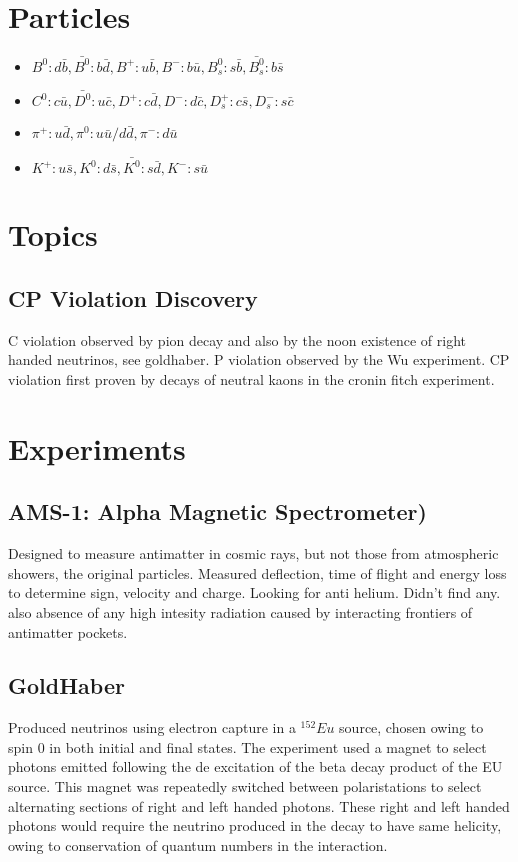 \documentclass[]{article}
\begin{document}
\large

\section*{Particles}

\begin{itemize}
	\item $B^0: d\bar{b}, \bar{B^0}: b\bar{d}, B^+: u\bar{b}, B^-: b\bar{u}, B_s^0: s\bar{b}, \bar{B_s^0}: b\bar{s}$
	\item $C^0: c\bar{u}, \bar{D^0}: u\bar{c}, D^+: c\bar{d}, D^-: d\bar{c}, D_s^+: c\bar{s}, D_s^-: s\bar{c}$
	\item $\pi^+: u\bar{d}, \pi^0: u\bar{u} / d\bar{d}, \pi^-: d\bar{u}$
	\item $K^+: u\bar{s}, K^0: d\bar{s}, \bar{K^0}: s\bar{d}, K^-: s\bar{u}$
	
\end{itemize}

\section{Topics}

\subsection{CP Violation Discovery}

	C violation observed by pion decay and also by the noon existence of right handed neutrinos, see goldhaber. P violation observed by the Wu experiment. CP violation first proven by decays of neutral kaons in the cronin fitch experiment.

\section{Experiments}
 
 
 \subsection{AMS-1: Alpha Magnetic Spectrometer)} 
	 Designed to measure antimatter in cosmic rays, but not those from atmospheric showers, the original particles. Measured deflection, time of flight and energy loss to determine sign, velocity and charge. Looking for anti helium. Didn't find any. also absence of any high intesity radiation caused by interacting frontiers of antimatter pockets.
	 
	\subsection{GoldHaber}
	Produced neutrinos using electron capture in a $^{152}Eu$ source, chosen owing to spin 0 in both initial and final states. The experiment used a magnet to select photons emitted following the de excitation of the beta decay product of the EU source. This magnet was repeatedly switched between polaristations to select alternating sections of right and left handed photons. These right and left handed photons would require the neutrino produced in the decay to have same helicity, owing to conservation of quantum numbers in the interaction.
	
\end{document}
